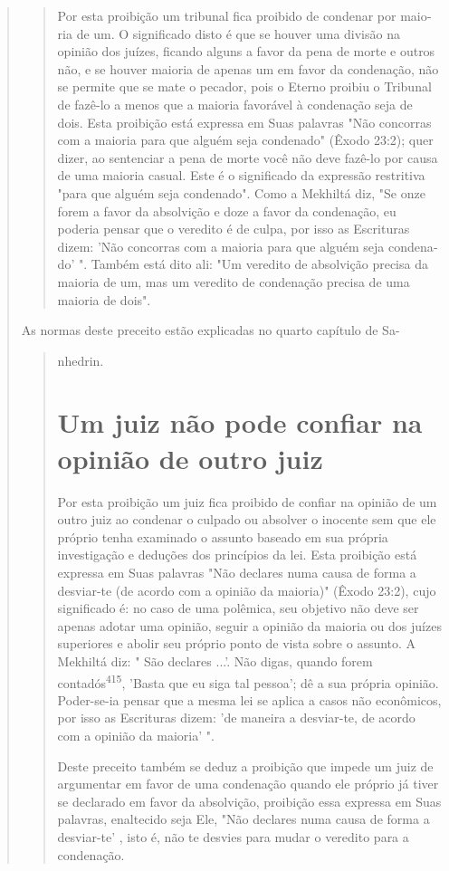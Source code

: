\begin{quote}
\begin{quote}
Por esta proibição um tribunal fica proibido de condenar por maio­ria de
um. O significado disto é que se houver uma divisão na opinião dos
juízes, ficando alguns a favor da pena de morte e outros não, e se
houver maioria de apenas um em favor da condenação, não se permite que
se mate o pecador, pois o Eterno proibiu o Tribunal de fazê-lo a menos
que a maioria favorável à conde­nação seja de dois. Esta proibição está
expressa em Suas palavras "Não concor­ras com a maioria para que alguém
seja condenado" (Êxodo 23:2); quer dizer, ao sentenciar a pena de morte
você não deve fazê-lo por causa de uma maioria casual. Este é o
significado da expressão restritiva "para que alguém seja conde­nado".
Como a Mekhiltá diz, "Se onze forem a favor da absolvição e doze a
fa­vor da condenação, eu poderia pensar que o veredito é de culpa, por
isso as Escrituras dizem: 'Não concorras com a maioria para que alguém
seja condena­do' ". Também está dito ali: "Um veredito de absolvição
precisa da maioria de um, mas um veredito de condenação precisa de uma
maioria de dois".
\end{quote}

As normas deste preceito estão explicadas no quarto capítulo de Sa-

\begin{quote}
nhedrin.

\section{Um juiz não pode confiar na opinião de outro juiz}

Por esta proibição um juiz fica proibido de confiar na opinião de um
outro juiz ao condenar o culpado ou absolver o inocente sem que ele
próprio tenha examinado o assunto baseado em sua própria investigação e
deduções dos princípios da lei. Esta proibição está expressa em Suas
palavras "Não decla­res numa causa de forma a desviar-te (de acordo com
a opinião da maioria)" (Êxodo 23:2), cujo significado é: no caso de uma
polêmica, seu objetivo não deve ser apenas adotar uma opinião, seguir a
opinião da maioria ou dos juízes superiores e abolir seu próprio ponto
de vista sobre o assunto. A Mekhiltá diz: " São declares ...'. Não
digas, quando forem contadós\textsuperscript{415}, 'Basta que eu siga
tal pessoa'; dê a sua própria opinião. Poder-se-ia pensar que a mesma
lei se apli­ca a casos não econômicos, por isso as Escrituras dizem: 'de
maneira a desviar-te, de acordo com a opinião da maioria' ".

Deste preceito também se deduz a proibição que impede um juiz de
argumentar em favor de uma condenação quando ele próprio já tiver se
decla­rado em favor da absolvição, proibição essa expressa em Suas
palavras, enalte­cido seja Ele, "Não declares numa causa de forma a
desviar-te' , isto é, não te desvies para mudar o veredito para a
condenação.


\end{quote}
\end{quote}
